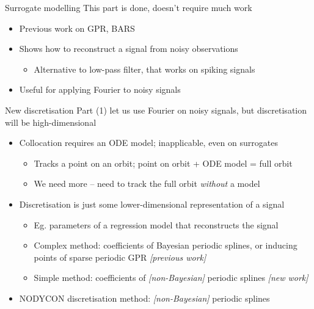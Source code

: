 \documentclass[presentation]{beamer}
\begin{document}
\begin{frame}[label={sec:orgcbb7095}]{Surrogate modelling}
This part is done, doesn't require much work
\vfill
\begin{itemize}
\item Previous work on GPR, BARS
\item Shows how to reconstruct a signal from noisy observations
\begin{itemize}
\item Alternative to low-pass filter, that works on spiking signals
\end{itemize}
\item Useful for applying Fourier to noisy signals
\end{itemize}
\end{frame}


\begin{frame}[label={sec:org11a6f53}]{New discretisation}
Part (1) let us use Fourier on noisy signals, but discretisation will be high-dimensional
\begin{itemize}[<+->]
\item Collocation requires an ODE model; inapplicable, even on surrogates
\begin{itemize}
\item Tracks a point on an orbit; point on orbit + ODE model = full orbit
\item We need more -- need to track the full orbit \emph{without} a model
\end{itemize}
\item Discretisation is just some lower-dimensional representation of a signal
\begin{itemize}
\item Eg. parameters of a regression model that reconstructs the signal
\item Complex method: coefficients of Bayesian periodic splines, or inducing points of sparse periodic GPR \emph{[previous work]}
\item Simple method: coefficients of \emph{[non-Bayesian]} periodic splines \emph{[new work]}
\end{itemize}
\item NODYCON discretisation method: \emph{[non-Bayesian]} periodic splines
\end{itemize}
\end{frame}
\end{document}
